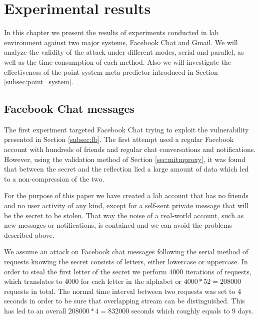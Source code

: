 \chapter{Experimental results}\label{ch:experiment}

In this chapter we present the results of experiments conducted in lab
environment against two major systems, Facebook Chat and Gmail. We will analyze
the validity of the attack under different modes, serial and parallel, as well
as the time consumption of each method. Also we will investigate the
effectiveness of the point-system meta-predictor introduced in Section
\ref{subsec:point_system}.

\section{Facebook Chat messages}\label{sec:fb_experiment}

The first experiment targeted Facebook Chat trying to exploit the vulnerability
presented in Section \ref{subsec:fb}. The first attempt used a regular Facebook
account with hundreds of friends and regular chat conversations and
notifications. However, using the validation method of Section
\ref{sec:mitmproxy}, it was found that between the secret and the reflection
lied a large amount of data which led to a non-compression of the two.

For the purpose of this paper we have created a lab account that has no friends
and no user activity of any kind, except for a self-sent private message that
will be the secret to be stolen. That way the noise of a real-world account,
such as new messages or notifications, is contained and we can avoid the
problems described above.

We assume an attack on Facebook chat messages following the serial method of
requests knowing the secret consists of letters, either lowercase or uppercase.
In order to steal the first letter of the secret we perform 4000 iterations of
requests, which translates to 4000 for each letter in the alphabet or
\begin{math}4000*52=208000\end{math} requests in total. The normal time
interval between two requests was set to 4 seconds in order to be sure that
overlapping stream can be distinguished. This has led to an overall
\begin{math}208000*4 = 832000\end{math} seconds which roughly equals to 9 days.

